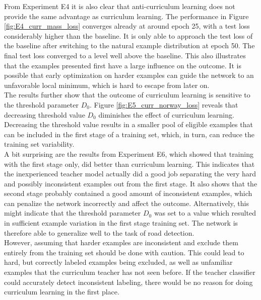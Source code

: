 From Experiment E4 it is also clear that anti-curriculum learning does not provide the same advantage as curriculum learning. The performance in Figure \ref{fig:E4_curr_mass_loss} converges already at around epoch 25, with a test loss considerably higher than the baseline. It is only able to approach the test loss of the baseline after switching to the natural example distribution at epoch 50. The final test loss converged to a level well above the baseline. This also illustrates that the examples presented first have a large influence on the outcome. It is possible that early optimization on harder examples can guide the network to an unfavorable local minimum, which is hard to escape from later on.\\

The results further show that the outcome of curriculum learning is sensitive to the threshold parameter $D_0$. Figure \ref{fig:E5_curr_norway_loss} reveals that decreasing threshold value $D_0$ diminishes the effect of curriculum learning. Decreasing the threshold value results in a smaller pool of eligible examples that can be included in the first stage of a training set, which, in turn, can reduce the training set variability.\\ 

A bit surprising are the results from Experiment E6, which showed that training with the first stage only, did better than curriculum learning. This indicates that the inexperienced teacher model actually did a good job separating  the very hard and possibly inconsistent examples out from the first stage. It also shows that the second stage probably contained a good amount of inconsistent examples, which can penalize the network incorrectly and affect the outcome. Alternatively, this might indicate that the threshold parameter $D_0$ was set to a value which resulted in sufficient example variation in the first stage training set. The network is therefore able to generalize well to the task of road detection.\\

However, assuming that harder examples are inconsistent and exclude them entirely from the training set should be done with caution. This could lead to hard, but correctly labeled examples being excluded, as well as unfamiliar examples that the curriculum teacher has not seen before. If the teacher classifier could accurately detect inconsistent labeling, there would be no reason for doing curriculum learning in the first place.\\ 

